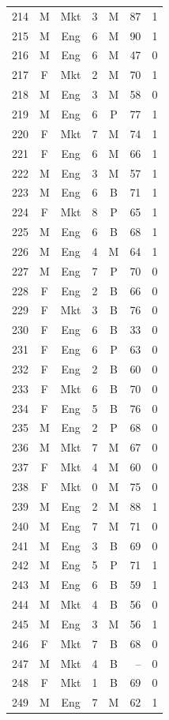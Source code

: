 \documentclass[11pt,a4paper]{article}
\begin{document}
\begin{center}
\begin{tabular}[t]{@{}r c c r c r c@{}}
214 & M & Mkt & 3 & M & 87 & 1 \\
215 & M & Eng & 6 & M & 90 & 1 \\
216 & M & Eng & 6 & M & 47 & 0 \\
217 & F & Mkt & 2 & M & 70 & 1 \\
218 & M & Eng & 3 & M & 58 & 0 \\
219 & M & Eng & 6 & P & 77 & 1 \\
220 & F & Mkt & 7 & M & 74 & 1 \\
221 & F & Eng & 6 & M & 66 & 1 \\
222 & M & Eng & 3 & M & 57 & 1 \\
223 & M & Eng & 6 & B & 71 & 1 \\
224 & F & Mkt & 8 & P & 65 & 1 \\
225 & M & Eng & 6 & B & 68 & 1 \\
226 & M & Eng & 4 & M & 64 & 1 \\
227 & M & Eng & 7 & P & 70 & 0 \\
228 & F & Eng & 2 & B & 66 & 0 \\
229 & F & Mkt & 3 & B & 76 & 0 \\
230 & F & Eng & 6 & B & 33 & 0 \\
231 & F & Eng & 6 & P & 63 & 0 \\
232 & F & Eng & 2 & B & 60 & 0 \\
233 & F & Mkt & 6 & B & 70 & 0 \\
234 & F & Eng & 5 & B & 76 & 0 \\
235 & M & Eng & 2 & P & 68 & 0 \\
236 & M & Mkt & 7 & M & 67 & 0 \\
237 & F & Mkt & 4 & M & 60 & 0 \\
238 & F & Mkt & 0 & M & 75 & 0 \\
239 & M & Eng & 2 & M & 88 & 1 \\
240 & M & Eng & 7 & M & 71 & 0 \\
241 & M & Eng & 3 & B & 69 & 0 \\
242 & M & Eng & 5 & P & 71 & 1 \\
243 & M & Eng & 6 & B & 59 & 1 \\
244 & M & Mkt & 4 & B & 56 & 0 \\
245 & M & Eng & 3 & M & 56 & 1 \\
246 & F & Mkt & 7 & B & 68 & 0 \\
247 & M & Mkt & 4 & B & -- & 0 \\
248 & F & Mkt & 1 & B & 69 & 0 \\
249 & M & Eng & 7 & M & 62 & 1 \\

\end{tabular}
\end{center}
\end{document}

